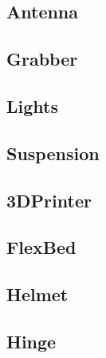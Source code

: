 \newcommand{\AssemblyInstructionManual}[1]{
 \subsection{#1}
 
 }

\AssemblyInstructionManual{Antenna}
\AssemblyInstructionManual{Grabber}
\AssemblyInstructionManual{Lights}
\AssemblyInstructionManual{Suspension}
\AssemblyInstructionManual{3DPrinter}
\AssemblyInstructionManual{FlexBed}
\AssemblyInstructionManual{Helmet}
\AssemblyInstructionManual{Hinge}

